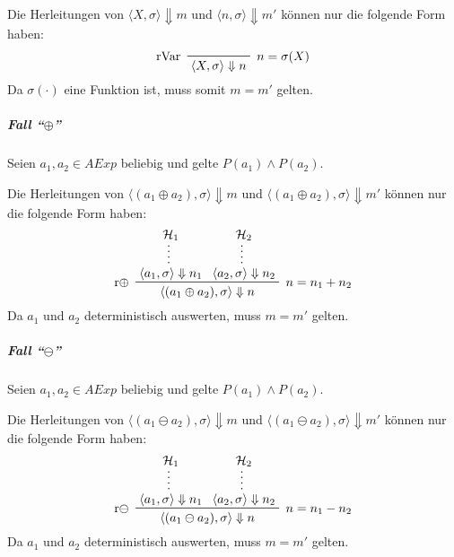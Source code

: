 		 		    Die Herleitungen von $ \langle X, \sigma \rangle \Downarrow m $ und $ \langle n, \sigma \rangle \Downarrow m' $ können nur die folgende Form haben:
		 		    \begin{equation*}
			 		    \prftree[l, r]
				 		    { $ n = \sigma(X) $ }
				 		    { rVar }
				 		    { \langle X, \sigma \rangle \Downarrow n }
		 		    \end{equation*}
		 		    Da $ \sigma(\cdot) $ eine Funktion ist, muss somit $ m = m' $ gelten.
	 		    
	 		    \subparagraph{Fall \enquote{$ \oplus $}}
		 		    Seien $ a _ 1, a _ 2 \in \textit{AExp} $ beliebig und gelte $ P(a _ 1) \land P(a _ 2) $.
		 		    
		 		    Die Herleitungen von $ \langle (a _ 1 \oplus a _ 2), \sigma \rangle \Downarrow m $ und $ \langle (a _ 1 \oplus a _ 2), \sigma \rangle \Downarrow m' $ können nur die folgende Form haben:
		 		    \begin{equation*}
			 		    \prftree[l, r]
				 		    { $ n = n _ 1 + n _ 2 $ }
				 		    { r$ \oplus $ }
				 		    { \prfsummary{\mathcal{H} _ 1}{\langle a _ 1, \sigma \rangle \Downarrow n _ 1} }
				 		    { \prfsummary{\mathcal{H} _ 2}{\langle a _ 2, \sigma \rangle \Downarrow n _ 2} }
				 		    { \langle (a _ 1 \oplus a _ 2), \sigma \rangle \Downarrow n }
		 		    \end{equation*}
		 		    Da $ a _ 1 $ und $ a _ 2 $ deterministisch auswerten, muss $ m = m' $ gelten.
	 		    
	 		    \subparagraph{Fall \enquote{$ \ominus $}}
		 		    Seien $ a _ 1, a _ 2 \in \textit{AExp} $ beliebig und gelte $ P(a _ 1) \land P(a _ 2) $.
		 		    
		 		    Die Herleitungen von $ \langle (a _ 1 \ominus a _ 2), \sigma \rangle \Downarrow m $ und $ \langle (a _ 1 \ominus a _ 2), \sigma \rangle \Downarrow m' $ können nur die folgende Form haben:
		 		    \begin{equation*}
			 		    \prftree[l, r]
				 		    { $ n = n _ 1 - n _ 2 $ }
				 		    { r$ \ominus $ }
				 		    { \prfsummary{\mathcal{H} _ 1}{\langle a _ 1, \sigma \rangle \Downarrow n _ 1} }
				 		    { \prfsummary{\mathcal{H} _ 2}{\langle a _ 2, \sigma \rangle \Downarrow n _ 2} }
				 		    { \langle (a _ 1 \ominus a _ 2), \sigma \rangle \Downarrow n }
		 		    \end{equation*}
		 		    Da $ a _ 1 $ und $ a _ 2 $ deterministisch auswerten, muss $ m = m' $ gelten.
	 		    
